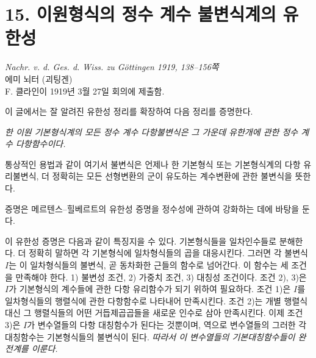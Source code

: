 
\section*{15. 이원형식의 정수 계수 불변식계의 유한성}

\begin{center}
\emph{Nachr. v. d. Ges. d. Wiss. zu Göttingen 1919, 138--156쪽}\\[5em]
에미 뇌터 (괴팅겐)\\[0.8em]
F. 클라인이 1919년 3월 27일 회의에 제출함.
\end{center}

이 글에서는 잘 알려진 유한성 정리를 확장하여 다음 정리를 증명한다.

\emph{한 이원 기본형식계의 모든 정수 계수 다항불변식은 그 가운데 유한개에 관한 정수 계수 다항함수이다.}

통상적인 용법과 같이 여기서 \glqq{}불변식\grqq{}은 언제나 한 기본형식 또는 기본형식계의 다항 유리불변식, 더 정확히는 모든 선형변환의 군이 유도하는 계수변환에 관한 불변식을 뜻한다.

증명은 메르텐스--힐베르트의 유한성 증명을 정수성에 관하여 강화하는 데에 바탕을 둔다.

이 유한성 증명은 다음과 같이 특징지을 수 있다. 기본형식들을 일차인수들로 분해한다. 더 정확히 말하면 각 기본형식에 일차형식들의 곱을 대응시킨다. 그러면 각 불변식 \(I\)는 이 일차형식들의 불변식, 곧 동차화한 근들의 함수로 넘어간다. 이 함수는 세 조건을 만족해야 한다. 1) 불변성 조건, 2) 가중치 조건, 3) 대칭성 조건이다. 조건 2), 3)은 \(I\)가 기본형식의 계수들에 관한 다항 유리함수가 되기 위하여 필요하다. 조건 1)은 \(I\)를 일차형식들의 행렬식에 관한 다항함수로 나타내어 만족시킨다. 조건 2)는 개별 행렬식 대신 그 행렬식들의 어떤 거듭제곱곱들을 새로운 인수로 삼아 만족시킨다. 이제 조건 3)은 \(I\)가 변수열들의 다항 대칭함수가 된다는 것뿐이며, 역으로 변수열들의 그러한 각 대칭함수는 기본형식들의 불변식이 된다. \emph{따라서 이 변수열들의 기본대칭함수들이 완전계를 이룬다.}


